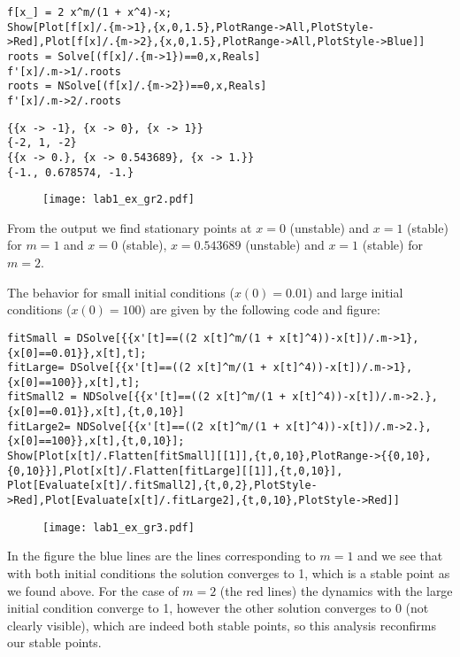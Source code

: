 \documentclass[11pt,a4paper,onecolumn]{article}
\begin{document}
\begin{lstlisting}[mathescape]
f[x_] = 2 x^m/(1 + x^4)-x;
Show[Plot[f[x]/.{m->1},{x,0,1.5},PlotRange->All,PlotStyle->Red],Plot[f[x]/.{m->2},{x,0,1.5},PlotRange->All,PlotStyle->Blue]]
roots = Solve[(f[x]/.{m->1})==0,x,Reals]
f'[x]/.m->1/.roots
roots = NSolve[(f[x]/.{m->2})==0,x,Reals]
f'[x]/.m->2/.roots
\end{lstlisting}
\begin{lstlisting}[mathescape]
{{x -> -1}, {x -> 0}, {x -> 1}}
{-2, 1, -2}
{{x -> 0.}, {x -> 0.543689}, {x -> 1.}}
{-1., 0.678574, -1.}
\end{lstlisting}

\begin{figure}[H]
  \centering
  \texttt{[image: lab1\_ex\_gr2.pdf]}
\end{figure}

From the output we find stationary points at $x = 0$ (unstable) and $x = 1$ (stable) for $m = 1$ and $x = 0$ (stable), $x = 0.543689$ (unstable) and $x = 1$ (stable) for $m = 2$.

The behavior for small initial conditions ($x(0) = 0.01$) and large initial conditions ($x(0) = 100$) are given by the following code and figure:

\begin{lstlisting}[mathescape]
fitSmall = DSolve[{{x'[t]==((2 x[t]^m/(1 + x[t]^4))-x[t])/.m->1},{x[0]==0.01}},x[t],t];
fitLarge= DSolve[{{x'[t]==((2 x[t]^m/(1 + x[t]^4))-x[t])/.m->1},{x[0]==100}},x[t],t];
fitSmall2 = NDSolve[{{x'[t]==((2 x[t]^m/(1 + x[t]^4))-x[t])/.m->2.},{x[0]==0.01}},x[t],{t,0,10}]
fitLarge2= NDSolve[{{x'[t]==((2 x[t]^m/(1 + x[t]^4))-x[t])/.m->2.},{x[0]==100}},x[t],{t,0,10}];
Show[Plot[x[t]/.Flatten[fitSmall][[1]],{t,0,10},PlotRange->{{0,10},{0,10}}],Plot[x[t]/.Flatten[fitLarge][[1]],{t,0,10}],
Plot[Evaluate[x[t]/.fitSmall2],{t,0,2},PlotStyle->Red],Plot[Evaluate[x[t]/.fitLarge2],{t,0,10},PlotStyle->Red]]
\end{lstlisting}

\begin{figure}[H]
  \centering
  \texttt{[image: lab1\_ex\_gr3.pdf]}  
\end{figure}

In the figure the blue lines are the lines corresponding to $m = 1$ and we see that with both initial conditions the solution converges to 1, which is a stable point as we found above. For the case of $m = 2$ (the red lines) the dynamics with the large initial condition converge to 1, however the other solution converges to 0 (not clearly visible), which are indeed both stable points, so this analysis reconfirms our stable points.
\end{document}
